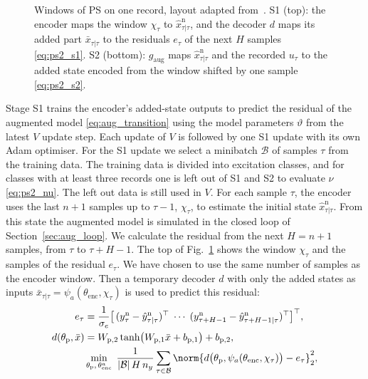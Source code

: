 \begin{figure}[t]
 \centering
 \resizebox{\columnwidth}{!}{}
 \caption{Windows of PS on one record, layout adapted
 from~\cite[Fig.~2]{hefny2015supervised}. S1 (top): the encoder maps the
 window $\chi_\tau$ to $\hat x^{\mathrm n}_{\tau|\tau}$, and the decoder $d$ maps its added part
 $\bar x_{\tau|\tau}$ to the residuals $e_\tau$ of the next $H$ samples
 \eqref{eq:ps2_s1}. S2 (bottom): $g_{\mathrm{aug}}$ maps $\hat x^{\mathrm n}_{\tau|\tau}$ and the
 recorded $u_\tau$ to the added state encoded from the window shifted by one
 sample \eqref{eq:ps2_s2}.}
 \label{fig:ps2_windows}
\end{figure}

Stage S1 trains the encoder's added-state outputs to predict the residual of
the augmented model \eqref{eq:aug_transition} using the model parameters $\vartheta$
from the latest $V$ update step.
Each update of $V$ is followed by one S1 update with its own Adam optimiser.
For the S1 update we select a minibatch $\mathcal B$ of samples $\tau$ from the training data.
The training data is divided into excitation classes, and for classes
with at least three records one is left out of S1 and S2 to evaluate $\nu$ \eqref{eq:ps2_nu}.
The left out data is still used in $V$.
For each sample $\tau$, the encoder uses the last $n+1$
samples up to $\tau-1$, $\chi_\tau$, to estimate the initial state $\hat x^{\mathrm n}_{\tau|\tau}$.
From this state the augmented model is simulated in the closed loop of 
Section~\ref{sec:aug_loop}.
We calculate the residual from the next $H=n+1$ samples, from $\tau$ to $\tau+H-1$.
The top of Fig.~\ref{fig:ps2_windows} shows the window $\chi_\tau$ and the
samples of the residual $e_\tau$.
We have chosen to use the same number of samples as the encoder window.
Then a temporary decoder $d$ with only the added states as inputs
$\bar x_{\tau|\tau}=\psi_a(\theta_{\mathrm{enc}},\chi_\tau)$
is used to predict this residual:
\begin{equation}
\begin{aligned}
 e_\tau&=\frac{1}{\sigma_e}\bigl[\,(y^{\mathrm n}_{\tau}-\hat y^{\mathrm n}_{\tau|\tau})^\top\;\cdots\;
  (y^{\mathrm n}_{\tau+H-1}-\hat y^{\mathrm n}_{\tau+H-1|\tau})^\top\bigr]^\top,\\
 d(\theta_{\mathrm p},\bar x)&=W_{\mathrm p,2}\tanh\bigl(W_{\mathrm p,1}\bar x+b_{\mathrm p,1}\bigr)+b_{\mathrm p,2},\\
 &\min_{\theta_{\mathrm p},\,\theta^a_{\mathrm{enc}}}\;
 \frac{1}{|\mathcal B|\,H\,n_y}\sum_{\tau\in\mathcal B}
 \norm{d\bigl(\theta_{\mathrm p},\psi_a(\theta_{\mathrm{enc}},\chi_\tau)\bigr)-e_\tau}_2^2,
\end{aligned}
\label{eq:ps2_s1}
\end{equation}
